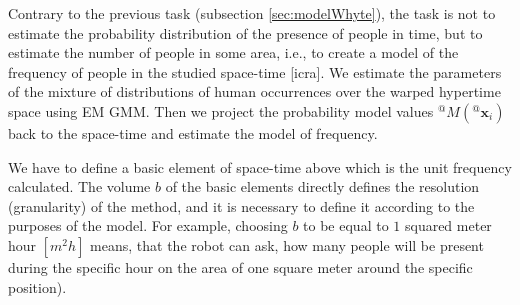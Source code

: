 %


Contrary to the previous task (subsection \ref{sec:modelWhyte}), the task is not to estimate the probability distribution of the presence of people in time, but to estimate the number of people in some area, i.e., to create a model of the frequency of people in the studied space-time [icra].
We estimate the parameters of the mixture of distributions of human occurrences over the warped hypertime space using EM GMM.
Then we project the probability model values ${}^{@}M({}^{@}\mathbf{x}_{i})$ back to the space-time and estimate the model of frequency.

We have to define a basic element of space-time above which is the unit frequency calculated. 
The volume $b$ of the basic elements directly defines the resolution (granularity) of the method, and it is necessary to define it according to the purposes of the model.
For example, choosing $b$ to be equal to $1$ squared meter hour $[m^{2}h]$ means, that the robot can ask, how many people will be present during the specific hour on the area of one square meter around the specific position). 

